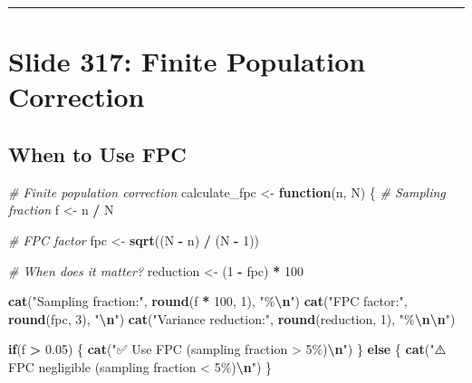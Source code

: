 \documentclass[
]{article}
\newenvironment{Shaded}{\begin{snugshade}}{\end{snugshade}}
\newcommand{\CommentTok}[1]{\textcolor[rgb]{0.56,0.35,0.01}{\textit{#1}}}
\newcommand{\ControlFlowTok}[1]{\textcolor[rgb]{0.13,0.29,0.53}{\textbf{#1}}}
\newcommand{\DecValTok}[1]{\textcolor[rgb]{0.00,0.00,0.81}{#1}}
\newcommand{\FloatTok}[1]{\textcolor[rgb]{0.00,0.00,0.81}{#1}}
\newcommand{\FunctionTok}[1]{\textcolor[rgb]{0.13,0.29,0.53}{\textbf{#1}}}
\newcommand{\NormalTok}[1]{#1}
\newcommand{\OtherTok}[1]{\textcolor[rgb]{0.56,0.35,0.01}{#1}}
\newcommand{\SpecialCharTok}[1]{\textcolor[rgb]{0.81,0.36,0.00}{\textbf{#1}}}
\newcommand{\StringTok}[1]{\textcolor[rgb]{0.31,0.60,0.02}{#1}}
\begin{document}
\begin{center}\rule{0.5\linewidth}{0.5pt}\end{center}

\section{Slide 317: Finite Population
Correction}\label{slide-317-finite-population-correction}

\subsection{When to Use FPC}\label{when-to-use-fpc}

\begin{Shaded}
\begin{Highlighting}[]
\CommentTok{\# Finite population correction}
\NormalTok{calculate\_fpc }\OtherTok{\textless{}{-}} \ControlFlowTok{function}\NormalTok{(n, N) \{}
  \CommentTok{\# Sampling fraction}
\NormalTok{  f }\OtherTok{\textless{}{-}}\NormalTok{ n }\SpecialCharTok{/}\NormalTok{ N}
  
  \CommentTok{\# FPC factor}
\NormalTok{  fpc }\OtherTok{\textless{}{-}} \FunctionTok{sqrt}\NormalTok{((N }\SpecialCharTok{{-}}\NormalTok{ n) }\SpecialCharTok{/}\NormalTok{ (N }\SpecialCharTok{{-}} \DecValTok{1}\NormalTok{))}
  
  \CommentTok{\# When does it matter?}
\NormalTok{  reduction }\OtherTok{\textless{}{-}}\NormalTok{ (}\DecValTok{1} \SpecialCharTok{{-}}\NormalTok{ fpc) }\SpecialCharTok{*} \DecValTok{100}
  
  \FunctionTok{cat}\NormalTok{(}\StringTok{"Sampling fraction:"}\NormalTok{, }\FunctionTok{round}\NormalTok{(f }\SpecialCharTok{*} \DecValTok{100}\NormalTok{, }\DecValTok{1}\NormalTok{), }\StringTok{"\%}\SpecialCharTok{\textbackslash{}n}\StringTok{"}\NormalTok{)}
  \FunctionTok{cat}\NormalTok{(}\StringTok{"FPC factor:"}\NormalTok{, }\FunctionTok{round}\NormalTok{(fpc, }\DecValTok{3}\NormalTok{), }\StringTok{"}\SpecialCharTok{\textbackslash{}n}\StringTok{"}\NormalTok{)}
  \FunctionTok{cat}\NormalTok{(}\StringTok{"Variance reduction:"}\NormalTok{, }\FunctionTok{round}\NormalTok{(reduction, }\DecValTok{1}\NormalTok{), }\StringTok{"\%}\SpecialCharTok{\textbackslash{}n\textbackslash{}n}\StringTok{"}\NormalTok{)}
  
  \ControlFlowTok{if}\NormalTok{(f }\SpecialCharTok{\textgreater{}} \FloatTok{0.05}\NormalTok{) \{}
    \FunctionTok{cat}\NormalTok{(}\StringTok{"✅ Use FPC (sampling fraction \textgreater{} 5\%)}\SpecialCharTok{\textbackslash{}n}\StringTok{"}\NormalTok{)}
\NormalTok{  \} }\ControlFlowTok{else}\NormalTok{ \{}
    \FunctionTok{cat}\NormalTok{(}\StringTok{"⚠️ FPC negligible (sampling fraction \textless{} 5\%)}\SpecialCharTok{\textbackslash{}n}\StringTok{"}\NormalTok{)}
\NormalTok{  \}}
  

\end{Highlighting}
\end{Shaded}
\end{document}
